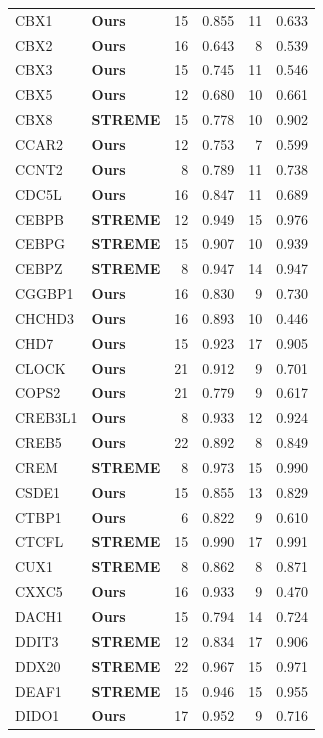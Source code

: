 \begin{table}[!ht]
\begin{tabular}{llrrrr}
CBX1 & \textbf{Ours} & 15 & 0.855 & 11 & 0.633 \\
CBX2 & \textbf{Ours} & 16 & 0.643 & 8 & 0.539 \\
CBX3 & \textbf{Ours} & 15 & 0.745 & 11 & 0.546 \\
CBX5 & \textbf{Ours} & 12 & 0.680 & 10 & 0.661 \\
CBX8 & \textbf{STREME} & 15 & 0.778 & 10 & 0.902 \\
CCAR2 & \textbf{Ours} & 12 & 0.753 & 7 & 0.599 \\
CCNT2 & \textbf{Ours} & 8 & 0.789 & 11 & 0.738 \\
CDC5L & \textbf{Ours} & 16 & 0.847 & 11 & 0.689 \\
CEBPB & \textbf{STREME} & 12 & 0.949 & 15 & 0.976 \\
CEBPG & \textbf{STREME} & 15 & 0.907 & 10 & 0.939 \\
CEBPZ & \textbf{STREME} & 8 & 0.947 & 14 & 0.947 \\
CGGBP1 & \textbf{Ours} & 16 & 0.830 & 9 & 0.730 \\
CHCHD3 & \textbf{Ours} & 16 & 0.893 & 10 & 0.446 \\
CHD7 & \textbf{Ours} & 15 & 0.923 & 17 & 0.905 \\
CLOCK & \textbf{Ours} & 21 & 0.912 & 9 & 0.701 \\
COPS2 & \textbf{Ours} & 21 & 0.779 & 9 & 0.617 \\
CREB3L1 & \textbf{Ours} & 8 & 0.933 & 12 & 0.924 \\
CREB5 & \textbf{Ours} & 22 & 0.892 & 8 & 0.849 \\
CREM & \textbf{STREME} & 8 & 0.973 & 15 & 0.990 \\
CSDE1 & \textbf{Ours} & 15 & 0.855 & 13 & 0.829 \\
CTBP1 & \textbf{Ours} & 6 & 0.822 & 9 & 0.610 \\
CTCFL & \textbf{STREME} & 15 & 0.990 & 17 & 0.991 \\
CUX1 & \textbf{STREME} & 8 & 0.862 & 8 & 0.871 \\
CXXC5 & \textbf{Ours} & 16 & 0.933 & 9 & 0.470 \\
DACH1 & \textbf{Ours} & 15 & 0.794 & 14 & 0.724 \\
DDIT3 & \textbf{STREME} & 12 & 0.834 & 17 & 0.906 \\
DDX20 & \textbf{STREME} & 22 & 0.967 & 15 & 0.971 \\
DEAF1 & \textbf{STREME} & 15 & 0.946 & 15 & 0.955 \\
DIDO1 & \textbf{Ours} & 17 & 0.952 & 9 & 0.716 \\

\end{tabular}
\end{table}
